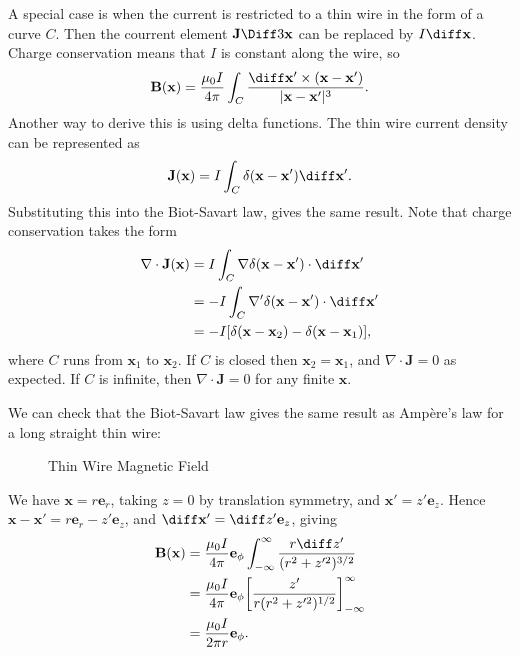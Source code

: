 \documentclass[12pt]{article}
\begin{document}
A special case is when the current is restricted to a thin wire in the form of a curve $C$. Then the courrent element $\mathbf{J} \Diff3 \mathbf{x}$ can be replaced by $I \diff \mathbf{x}$. Charge conservation means that $I$ is constant along the wire, so
\[
\mathbf{B}(\mathbf{x}) = \frac{\mu_0 I}{4 \pi} \int_{C} \frac{\diff \mathbf{x}' \times (\mathbf{x} - \mathbf{x}')}{|\mathbf{x} - \mathbf{x}'|^3}
.\]
Another way to derive this is using delta functions. The thin wire current density can be represented as
\[
\mathbf{J}(\mathbf{x}) = I \int_{C} \delta(\mathbf{x} - \mathbf{x}') \diff \mathbf{x}'
.\]
Substituting this into the Biot-Savart law, gives the same result. Note that charge conservation takes the form
\begin{align*}
	\nabla \cdot \mathbf{J}(\mathbf{x}) &= I \int_{C} \nabla \delta(\mathbf{x} - \mathbf{x}') \cdot \diff \mathbf{x}' \\
					    &= -I \int_{C} \nabla' \delta(\mathbf{x} - \mathbf{x}') \cdot \diff \mathbf{x}' \\
					    &= -I [\delta(\mathbf{x} - \mathbf{x}_2) - \delta(\mathbf{x} - \mathbf{x}_1)],
\end{align*}
where $C$ runs from $\mathbf{x}_1$ to $\mathbf{x}_2$. If $C$ is closed then $\mathbf{x}_2 = \mathbf{x}_1$, and $\nabla \cdot \mathbf{J} = 0$ as expected. If $C$ is infinite, then $\nabla \cdot \mathbf{J} = 0$ for any finite $\mathbf{x}$.

We can check that the Biot-Savart law gives the same result as Amp\`{e}re's law for a long straight thin wire:

\begin{figure}[h]
	\centering
	\caption{Thin Wire Magnetic Field}
	\label{fig:twmf}
\end{figure}

We have $\mathbf{x} = r \mathbf{e}_r$, taking $z = 0$ by translation symmetry, and $\mathbf{x}' = z' \mathbf{e}_z$. Hence $\mathbf{x} - \mathbf{x}' = r \mathbf{e}_r - z' \mathbf{e}_z$, and $\diff \mathbf{x}' = \diff z' \mathbf{e}_z$, giving
\begin{align*}
	\mathbf{B}(\mathbf{x}) &= \frac{\mu_0 I}{4 \pi} \mathbf{e}_{\phi} \int_{-\infty}^{\infty} \frac{r \diff z'}{(r^2 + z'^2)^{3/2}} \\
			       &= \frac{\mu_0 I}{4 \pi} \mathbf{e}_{\phi} \biggl[ \frac{z'}{r(r^2 + z'^2)^{1/2}} \biggr]_{-\infty}^{\infty} \\
			       &= \frac{\mu_0 I}{2 \pi r} \mathbf{e}_{\phi}.
\end{align*} 
\end{document}

